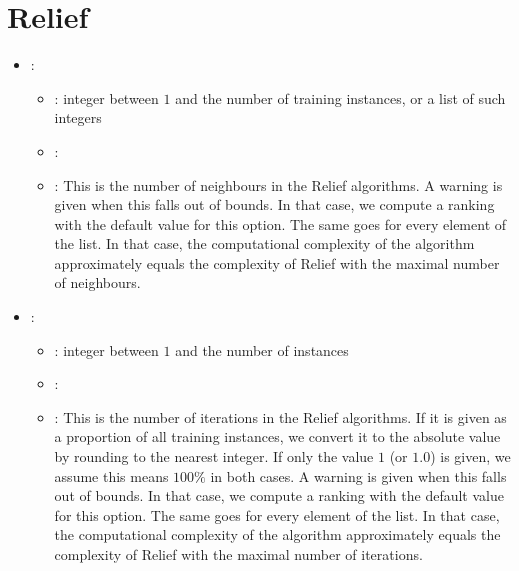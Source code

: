 \section{Relief}


\begin{itemize}
    \item {}:
           \begin{itemize}
                \item \optionPossibleValues{}: integer between $1$ and the number of training instances, or a list of such integers
                \item \optionDefaultValue{}: 
                \item \optionDescrption{}: This is the number of neighbours in the Relief algorithms. A warning is given
                                           when this falls out of bounds. In that case, we compute a ranking with the default value for this option.
                                           The same goes for every element of the list. In that case, the computational complexity of the algorithm
                                           approximately equals the complexity of Relief with the maximal number of neighbours.
           \end{itemize}
    \item {}:
           \begin{itemize}
                \item \optionPossibleValues{}: integer between $1$ and the number of instances
                \item \optionDefaultValue{}: 
                \item \optionDescrption{}: This is the number of iterations in the Relief algorithms. If it is given as a proportion
                                           of all training instances, we convert it to the absolute value by rounding to the nearest integer.
                                           If only the value $1$ (or $1.0$) is given, we assume this means $100\%$ in both cases. A warning is given
                                           when this falls out of bounds. In that case, we compute a ranking with the default value for this option.
                                           The same goes for every element of the list. In that case, the computational complexity of the algorithm
                                           approximately equals the complexity of Relief with the maximal number of iterations.

\end{itemize}
\end{itemize}
